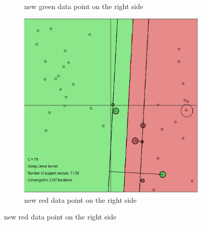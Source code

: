 \documentclass{article}
\begin{document}
\begin{figure}[]
\begin{subfigure}{0.33\linewidth}
            \caption{new green data point on the right side}
        \end{subfigure}
        \begin{subfigure}{0.33\linewidth}
            \includegraphics[width=\linewidth]{add3}
            \caption{new red data point on the right side}
        \end{subfigure}



\end{figure}
\end{document}
